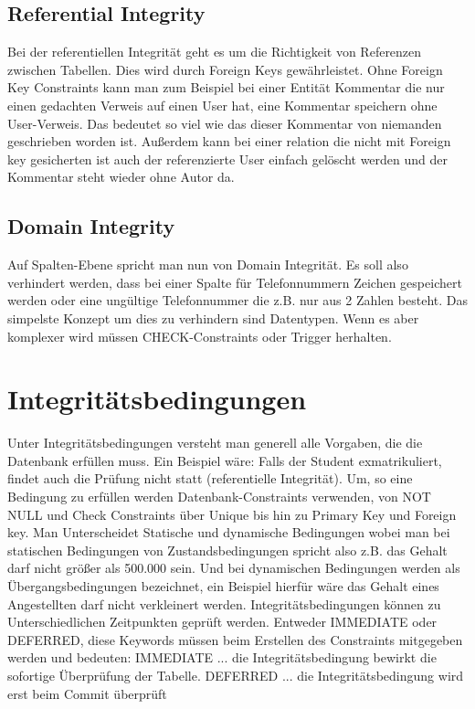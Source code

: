 \subsection{Referential Integrity}

Bei der referentiellen Integrität geht es um die Richtigkeit von Referenzen zwischen Tabellen. 
Dies wird durch Foreign Keys gewährleistet. 
Ohne Foreign Key Constraints kann man zum Beispiel bei einer Entität Kommentar die nur einen gedachten Verweis auf einen User hat, eine Kommentar speichern ohne User-Verweis. 
Das bedeutet so viel wie das dieser Kommentar von niemanden geschrieben worden ist. 
Außerdem kann bei einer relation die nicht mit Foreign key gesicherten ist auch der referenzierte User einfach gelöscht werden und der Kommentar steht wieder ohne Autor da.

\subsection{Domain Integrity}

Auf Spalten-Ebene spricht man nun von Domain Integrität. 
Es soll also verhindert werden, dass bei einer Spalte für Telefonnummern Zeichen gespeichert werden oder eine ungültige Telefonnummer die z.B. nur aus 2 Zahlen besteht. 
Das simpelste Konzept um dies zu verhindern sind Datentypen. 
Wenn es aber komplexer wird müssen CHECK-Constraints oder Trigger herhalten.

\section{Integritätsbedingungen}

Unter Integritätsbedingungen versteht man generell alle Vorgaben, die die Datenbank erfüllen muss. 
Ein Beispiel wäre: Falls der Student exmatrikuliert, findet auch die Prüfung nicht statt (referentielle Integrität). 
Um, so eine Bedingung zu erfüllen werden Datenbank-Constraints verwenden, von NOT NULL und Check Constraints über Unique bis hin zu Primary Key und Foreign key.
Man Unterscheidet Statische und dynamische Bedingungen wobei man bei statischen Bedingungen von Zustandsbedingungen spricht also z.B. das Gehalt darf nicht größer als 500.000 sein. 
Und bei dynamischen Bedingungen werden als Übergangsbedingungen bezeichnet, ein Beispiel hierfür wäre das Gehalt eines Angestellten darf nicht verkleinert werden.
Integritätsbedingungen können zu Unterschiedlichen Zeitpunkten geprüft werden. Entweder IMMEDIATE oder DEFERRED, diese Keywords müssen beim Erstellen des Constraints mitgegeben werden und bedeuten:
\newline
IMMEDIATE	...	  die Integritätsbedingung bewirkt die sofortige Überprüfung der Tabelle.
\newline
DEFERRED 	...	  die Integritätsbedingung wird erst beim Commit überprüft

